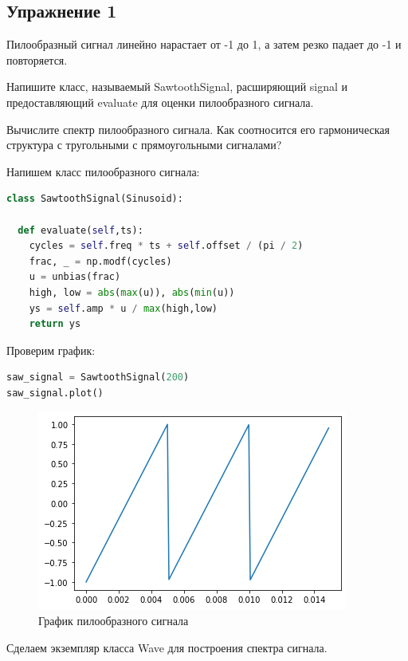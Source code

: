 \subsection{Упражнение 1}

Пилообразный сигнал линейно нарастает от -1 до 1, а затем резко падает до -1 и повторяется.

\noindent Напишите класс, называемый SawtoothSignal, расширяющий signal и предоставляющий evaluate для оценки пилообразного сигнала.

\noindent Вычислите спектр пилообразного сигнала. Как соотносится его гармоническая структура с тругольными с прямоугольными сигналами?

Напишем класс пилообразного сигнала:

\begin{lstlisting}[language=Python]
class SawtoothSignal(Sinusoid):

  def evaluate(self,ts):
    cycles = self.freq * ts + self.offset / (pi / 2)
    frac, _ = np.modf(cycles)
    u = unbias(frac)
    high, low = abs(max(u)), abs(min(u))
    ys = self.amp * u / max(high,low)
    return ys
\end{lstlisting}

Проверим график:

\begin{lstlisting}[language=Python]
saw_signal = SawtoothSignal(200)
saw_signal.plot()
\end{lstlisting}

\begin{figure}[H]
	\begin{center}
		\includegraphics[scale=1]{fig/lab02/lab02_5_0.png}
		\caption{График пилообразного сигнала}
	\end{center}
\end{figure}

Сделаем экземпляр класса Wave для построения спектра сигнала.

